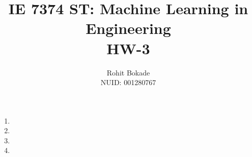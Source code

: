 \documentclass[11pt]{article}
\title{IE 7374 ST: Machine Learning in Engineering \\ HW-3}
\author{Rohit Bokade \\ NUID: 001280767}
\begin{document}
	
	\maketitle 
	\begin{enumerate}
		\item 
		\item 
		\item 
		\item 	
	\end{enumerate}	 
	
\end{document}
